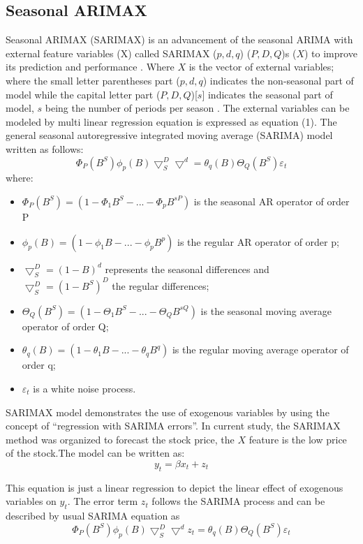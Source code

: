 \documentclass{ieeeojies}
\begin{document}
\subsection{Seasonal ARIMAX}
Seasonal ARIMAX (SARIMAX) is an advancement of the seasonal ARIMA with external feature variables (X) called SARIMAX ($p, d, q$) ($P,D,Q$)s ($X$) to improve its prediction and performance \cite{b9}. Where $X$ is the vector of external variables; where the small letter parentheses part ($p,d,q$) indicates the non-seasonal part of model while the capital letter part ($P,D,Q$)[$s$] indicates the seasonal part of model, $s$ being the number of periods per season \cite{b4}. The external variables can be modeled by multi linear regression equation is expressed as equation (1). The general seasonal autoregressive integrated moving average (SARIMA) model written as follows:
\begin{equation}
    \Phi_P(B^S)\phi_p(B)\bigtriangledown_S^D\bigtriangledown^d = \theta_q(B)\Theta_Q(B^S)\varepsilon_t
\end{equation}
where:
\begin{itemize}
    \item $\Phi_P(B^S) = (1 - \Phi_1B^S - ... - \Phi_pB^{sP})$ is the seasonal AR operator of order P
    \item $\phi_p(B) = (1 - \phi_1B - ... - \phi_pB^p)$ is the regular AR operator of order p;
    \item $\bigtriangledown_S^D = (1 - B)^d$ represents the seasonal differences and $\bigtriangledown_S^D = (1 - B^S)^D$ the regular differences;
    \item $\Theta_Q(B^S) = (1 - \Theta_1B^S - ... - \Theta_QB^{sQ})$ is the seasonal moving average operator of order Q;
    \item $\theta_q(B) = (1 - \theta_1B - ... - \theta_qB^q) $ is the regular moving average operator of order q;
    \item $\varepsilon_t$ is a white noise process.
\end{itemize}

SARIMAX model demonstrates the use of exogenous variables by using the concept of “regression with SARIMA errors”. In current study, the SARIMAX method was organized to forecast the stock price, the $X$ feature is the low price of the stock.The model can be written as:
\begin{equation}
    y_t = \beta x_t + z_t
\end{equation}

This equation is just a linear regression to depict the linear effect of exogenous variables on $y_t$. The error term $z_t$ follows the SARIMA process and can be described by usual SARIMA equation as
\begin{equation}
    \Phi_P(B^S)\phi_p(B)\bigtriangledown_S^D\bigtriangledown^dz_t = \theta_q(B)\Theta_Q(B^S)\varepsilon_t
\end{equation}
\end{document}
